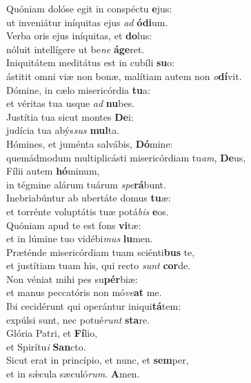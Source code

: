 \evenverse Quóniam dolóse egit in conspéctu \textbf{e}jus:~\*\\
\evenverse ut inveniátur iníquitas ejus \textit{ad} \textbf{ó}\textbf{di}um.\\
\oddverse Verba oris ejus iníquitas, et \textbf{do}lus:~\*\\
\oddverse nóluit intellígere ut be\textit{ne} \textbf{á}\textbf{ge}ret.\\
\evenverse Iniquitátem meditátus est in cubíli \textbf{su}o:~\*\\
\evenverse ástitit omni viæ non bonæ, malítiam autem non \textit{o}\textbf{dí}vit.\\
\oddverse Dómine, in cælo misericórdia \textbf{tu}a:~\*\\
\oddverse et véritas tua usque \textit{ad} \textbf{nu}bes.\\
\evenverse Justítia tua sicut montes \textbf{De}i:~\*\\
\evenverse judícia tua abýs\textit{sus} \textbf{mul}ta.\\
\oddverse Hómines, et juménta salvábis, \textbf{Dó}mine:~\*\\
\oddverse quemádmodum multiplicásti misericórdiam tu\textit{am}, \textbf{De}us,\\
\evenverse Fílii autem \textbf{hó}minum,~\*\\
\evenverse in tégmine alárum tuárum \textit{spe}\textbf{rá}bunt.\\
\oddverse Inebriabúntur ab ubertáte domus \textbf{tu}æ:~\*\\
\oddverse et torrénte voluptátis tuæ potá\textit{bis} \textbf{e}os.\\
\evenverse Quóniam apud te est fons \textbf{vi}tæ:~\*\\
\evenverse et in lúmine tuo vidébi\textit{mus} \textbf{lu}men.\\
\oddverse Præténde misericórdiam tuam sciénti\textbf{bus} te,~\*\\
\oddverse et justítiam tuam his, qui recto \textit{sunt} \textbf{cor}de.\\
\evenverse Non véniat mihi pes su\textbf{pér}biæ:~\*\\
\evenverse et manus peccatóris non mó\textit{ve}\textbf{at} me.\\
\oddverse Ibi cecidérunt qui operántur iniqui\textbf{tá}tem:~\*\\
\oddverse expúlsi sunt, nec potué\textit{runt} \textbf{sta}re.\\
\evenverse Glória Patri, et \textbf{Fí}lio,~\*\\
\evenverse et Spirítu\textit{i} \textbf{San}cto.\\
\oddverse Sicut erat in princípio, et nunc, et \textbf{sem}per,~\*\\
\oddverse et in sǽcula sæculó\textit{rum}. \textbf{A}men.\\
